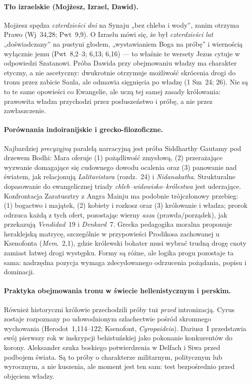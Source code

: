\paragraph*{Tło izraelskie (Mojżesz, Izrael, Dawid).}
Mojżesz spędza \emph{czterdzieści dni} na Synaju „bez chleba i wody”, zanim otrzyma Prawo (Wj~34,28; Pwt~9,9).
O Izraelu mówi się, że był \emph{czterdzieści lat} „doświadczany” na pustyni głodem, „wystawianiem Boga na próbę” i wiernością wyłącznie jemu (Pwt~8,2--3; 6,13; 6,16) — to właśnie te wersety Jezus cytuje w odpowiedzi Szatanowi.
Próba Dawida przy obejmowaniu władzy ma charakter etyczny, a nie ascetyczny: dwukrotnie otrzymuje możliwość skrócenia drogi do tronu przez zabicie Saula, ale odmawia sięgnięcia po władzę (1 Sm~24; 26).
Nie są to te same opowieści co Ewangelie, ale uczą tej samej zasady królowania: prawowita władza przychodzi przez posłuszeństwo i próbę, a nie przez zawłaszczenie.

\paragraph*{Porównania indoiranijskie i grecko-filozoficzne.}
Najbardziej \emph{precyzyjną} paralelą narracyjną jest próba Siddharthy Gautamy pod drzewem Bodhi: Mara oferuje (1) pożądliwość zmysłową, (2) przerażające wyzwanie domagające się cudownego dowodu ocalenia oraz (3) panowanie nad światem, jak relacjonują \emph{Lalitavistara} (rozdz.~24) i \emph{Nidanakatha}.
Strukturalne dopasowanie do ewangelicznej triady \emph{chleb–widowisko–królestwa} jest uderzające.
Konfrontacja Zaratusztry z Angra Mainju ma podobnie trójczłonowy przebieg: (1) bogactwo i majątek, (2) kobiety i rozkosz oraz (3) królowanie i władza; prorok odrzuca każdą z tych ofert, pozostając wierny \emph{asza} (prawda/porządek), jak przekazują \emph{Vendidad}~19 i \emph{Denkard}~7.
Grecka pedagogika moralna proponuje heraklejską matrycę, szczególnie w przypowieści Prodikosa zachowanej u Ksenofonta (\emph{Mem}.~2,1), gdzie królewski bohater musi wybrać trudną drogę cnoty zamiast łatwej drogi występku.
Formy są różne, ale logika progu pozostaje ta sama: nadrzędna pozycja wymaga zdecydowanego odrzucenia pożądania, popisu i dominacji.

\paragraph*{Praktyka obejmowania tronu w świecie hellenistycznym i perskim.}
Również historyczni królowie przechodzili próby tuż \emph{przed} intronizacją.
Cyrus zostaje rozpoznany po udowodnionym szlachectwie pośród skromnego wychowania (Herodot~1,114--122; Ksenofont, \emph{Cyropaideia}).
Dariusz~I przedstawia swój pierwszy rok w inskrypcji behistuńskiej jako pokonanie konkurentów do korony.
Aleksander szuka boskiego potwierdzenia w Delfach i Siwa przed podbojem świata.
Są to próby o charakterze militarnym, politycznym lub wyrocznym, a nie kuszenia, ale moment jest ten sam: test bezpośrednio przed objęciem władzy.

